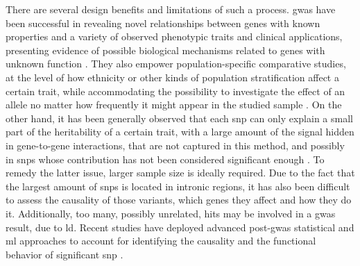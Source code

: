 There are several design benefits and limitations of such a process. \ac{gwas} have been successful in revealing novel relationships between genes with known properties and a variety of observed phenotypic traits and clinical applications, presenting evidence of possible biological mechanisms related to genes with unknown function \cite{Tam2019}. They also empower population-specific comparative studies, at the level of how ethnicity or other kinds of population stratification affect a certain trait, while accommodating the possibility to investigate the effect of an allele no matter how frequently it might appear in the studied sample \cite{Tam2019}. 
On the other hand, it has been generally observed  that each \ac{snp} can only explain a small part of the heritability of a certain trait, with a large amount of the signal hidden in gene-to-gene interactions, that are not captured in this method, and possibly in \acp{snp} whose contribution has not been considered significant enough  \cite{Tam2019}. To remedy the latter issue, larger sample size is ideally required. Due to the fact that the largest amount of \acp{snp} is located in intronic regions, it has also been difficult to assess the causality of those variants, which genes they affect and how they do it. Additionally, too many, possibly unrelated, hits may be involved in a \ac{gwas} result, due to \ac{ld}. \cite{Tam2019} Recent studies have deployed advanced post-\ac{gwas} statistical and \ac{ml} approaches to account for identifying the causality and the functional behavior of significant \ac{snp}  \cite{Nicholls2020,Gallagher2018}. 

